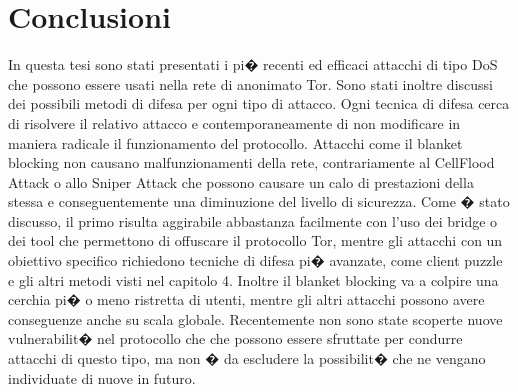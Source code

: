 \chapter{Conclusioni}

In questa tesi sono stati presentati i pi� recenti ed efficaci attacchi di tipo DoS che possono essere usati nella rete di anonimato Tor. Sono stati inoltre discussi dei possibili metodi di difesa per ogni tipo di attacco. Ogni tecnica di difesa cerca di risolvere il relativo attacco e contemporaneamente di non modificare in maniera radicale il funzionamento del protocollo. Attacchi come il blanket blocking non causano malfunzionamenti della rete, contrariamente al CellFlood Attack o allo Sniper Attack che possono causare un calo di prestazioni della stessa e conseguentemente una diminuzione del livello di sicurezza. Come � stato discusso, il primo risulta aggirabile abbastanza facilmente con l'uso dei bridge o dei tool che permettono di offuscare il protocollo Tor, mentre gli attacchi con un obiettivo specifico richiedono tecniche di difesa pi� avanzate, come client puzzle e gli altri metodi visti nel capitolo 4. Inoltre il blanket blocking va a colpire una cerchia pi� o meno ristretta di utenti, mentre gli altri attacchi possono avere conseguenze anche su scala globale. Recentemente non sono state scoperte nuove vulnerabilit� nel protocollo che che possono essere sfruttate per condurre attacchi di questo tipo, ma non � da escludere la possibilit� che ne vengano individuate di nuove in futuro.



